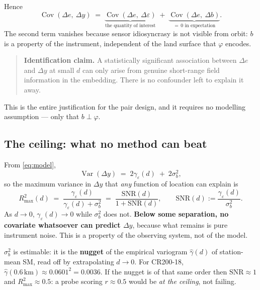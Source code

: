 \documentclass[11pt,a4paper]{article}
\newcommand{\Cov}{\operatorname{Cov}}
\newcommand{\Var}{\operatorname{Var}}
\begin{document}
Hence
\begin{equation}
  \Cov(\Delta e,\ \Delta y)
  \;=\; \underbrace{\Cov(\Delta e,\ \Delta\varepsilon)}_{\text{the quantity of interest}}
  \;+\; \underbrace{\Cov(\Delta e,\ \Delta b)}_{=\,0 \text{ in expectation}} .
  \label{eq:ident}
\end{equation}
The second term vanishes because sensor idiosyncrasy is not visible from orbit: $b$ is a
property of the instrument, independent of the land surface that $\varphi$ encodes.

\begin{quote}
\textbf{Identification claim.} A statistically significant association between $\Delta e$
and $\Delta y$ at small $d$ can only arise from genuine short-range field information in
the embedding. There is no confounder left to explain it away.
\end{quote}

This is the entire justification for the pair design, and it requires no modelling
assumption --- only that $b \perp \varphi$.

\subsection{The ceiling: what no method can beat}

From \eqref{eq:model},
\begin{equation}
  \Var(\Delta y) \;=\; 2\gamma_\varepsilon(d) \;+\; 2\sigma_b^2 ,
\end{equation}
so the maximum variance in $\Delta y$ that \emph{any} function of location can explain is
\begin{equation}
  \boxed{\;
  R^2_{\max}(d) \;=\; \frac{\gamma_\varepsilon(d)}{\gamma_\varepsilon(d) + \sigma_b^2}
  \;=\; \frac{\mathrm{SNR}(d)}{1 + \mathrm{SNR}(d)},
  \qquad \mathrm{SNR}(d) := \frac{\gamma_\varepsilon(d)}{\sigma_b^2}. \;}
  \label{eq:ceiling}
\end{equation}
As $d \to 0$, $\gamma_\varepsilon(d) \to 0$ while $\sigma_b^2$ does not. \textbf{Below some
separation, no covariate whatsoever can predict $\Delta y$}, because what remains is pure
instrument noise. This is a property of the observing system, not of the model.

$\sigma_b^2$ is estimable: it is the \textbf{nugget} of the empirical variogram
$\hat\gamma(d)$ of station-mean SM, read off by extrapolating $d \to 0$. For CR200-18,
$\hat\gamma(0.6\,\mathrm{km}) \approx 0.0601^2 = 0.0036$. If the nugget is of that same
order then $\mathrm{SNR} \approx 1$ and $R^2_{\max} \approx 0.5$: a probe scoring
$r \approx 0.5$ would be \emph{at the ceiling}, not failing.
\end{document}
